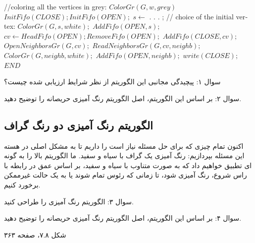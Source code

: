 \documentclass{book} %
\begin{document}
\begin{latin}
    
    \begin{algorithm}
        \caption{}\label{your_label}
        \begin{algorithmic}
            \STATE //coloring all the vertices in grey:
                \STATE $ColorGr(G, w, grey)$
            \ENDFOR
            \STATE $InitFifo(CLOSE); InitFifo(OPEN);$
            \STATE $s \leftarrow$ . . . ; // choice of the initial vertex:
            \STATE $ColorGr(G, s, white);$
            \STATE $AddFifo(OPEN, s);$
                \STATE $cv \leftarrow HeadFifo(OPEN); RemoveFifo(OPEN);$
                \STATE $AddFifo(CLOSE, cv);$
                \STATE $OpenNeighborsGr(G, cv);$
                    \STATE $ReadNeighborsGr(G, cv, neighb);$
                        \STATE $ColorGr(G, neighb, white);$
                        \STATE $AddFifo(OPEN, neighb);$
                    \ENDIF
                \ENDWHILE
            \ENDWHILE
            \STATE $write(CLOSE);$
            \STATE $END$
        \end{algorithmic}
    \end{algorithm}
        
\end{latin}

سوال ۱: پیچیدگی مجانبی این الگوریتم از نظر شرایط ارزیابی شده چیست؟

سوال ۲: بر اساس این الگوریتم، اصل الگوریتم رنگ آمیزی حریصانه را توضیح دهید.

\subsection*{الگوریتم رنگ آمیزی دو رنگ گراف}

اکنون تمام چیزی که برای حل مسئله نیاز است را داریم تا به مشکل اصلی در هسته این مسئله بپردازیم: رنگ آمیزی یک گراف با سیاه و سفید. ما الگوریتم بالا را به گونه ای تطبیق خواهیم داد که به صورت متناوب با سیاه و سفید، بر اساس عمق در رابطه با راس شروع، رنگ آمیزی شود، تا زمانی که رئوس تمام شوند یا به یک حالت غیرممکن برخورد کنیم.

سوال ۳: الگوریتم رنگ آمیزی را طراحی کنید.

سوال ۴: بر اساس این الگوریتم، اصل الگوریتم رنگ آمیزی حریصانه را توضیح دهید.

شکل ۷.۸، صفحه ۳۶۳
\end{document}
